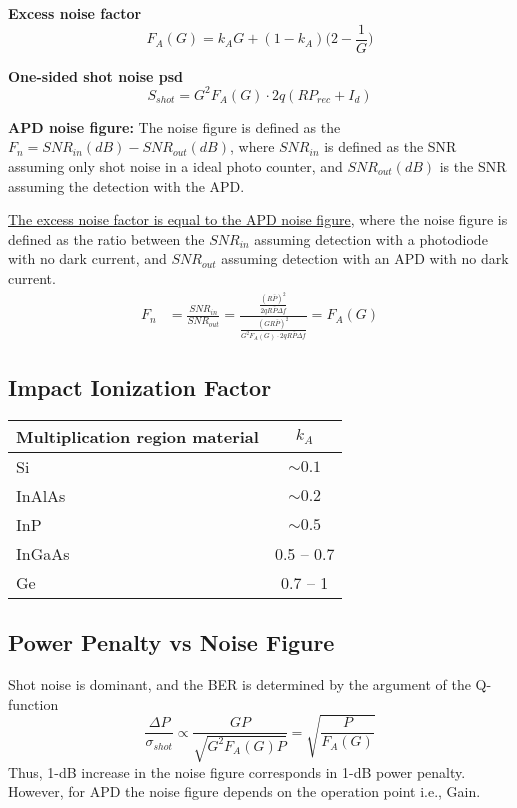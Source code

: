 \documentclass[a4paper]{article}
\begin{document}
\textbf{Excess noise factor}
\begin{equation}
F_A(G) = k_AG + (1-k_A)\Big(2 - \frac{1}{G}\Big)
\end{equation}

\textbf{One-sided shot noise psd}
\begin{equation}
S_{shot} = G^2F_A(G)\cdot 2q(RP_{rec} + I_d)
\end{equation}

\textbf{APD noise figure:} The noise figure is defined as the $F_n = SNR_{in}(dB) - SNR_{out}(dB)$, where $SNR_{in}$ is defined as the SNR assuming only shot noise in a ideal photo counter, and $SNR_{out}(dB)$ is the SNR assuming the detection with the APD.

\underline{The excess noise factor is equal to the APD noise figure}, where the noise figure is defined as the ratio between the $SNR_{in}$ assuming detection with a photodiode with no dark current, and $SNR_{out}$ assuming detection with an APD with no dark current.
\begin{align}
F_n &= \frac{SNR_{in}}{SNR_{out}} = \frac{\frac{(R\bar{P})^2}{2qR\bar{P}\Delta f}}{\frac{(GR\bar{P})^2}{G^2F_A(G)\cdot 2qR\bar{P}\Delta f}} = F_A(G)
\end{align}

\subsection{Impact Ionization Factor}
\begin{table}[t]
	\centering
	\begin{tabular}{p{3cm}|c}
		\hline
		Multiplication region material & $k_A$\\
		\hline
		Si & $\sim 0.1$ \\
		InAlAs & $\sim 0.2$ \\
		InP & $\sim 0.5$ \\
		InGaAs & 0.5 -- 0.7 \\
		Ge & 0.7 -- 1 \\
		\hline
	\end{tabular}
\end{table}

\subsection{Power Penalty vs Noise Figure}

Shot noise is dominant, and the BER is determined by the argument of the Q-function
\begin{equation}
\frac{\Delta P}{\sigma_{shot}} \propto \frac{GP}{\sqrt{G^2F_A(G)P}} = \sqrt{\frac{P}{F_A(G)}}
\end{equation}
Thus, 1-dB increase in the noise figure corresponds in 1-dB power penalty. However, for APD the noise figure depends on the operation point i.e., Gain.
\end{document}
